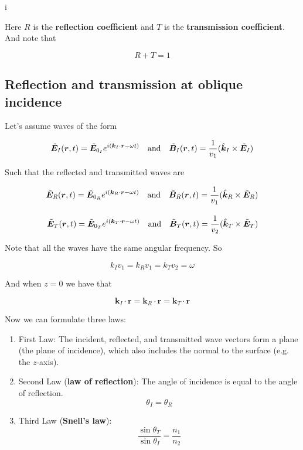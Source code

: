 i\documentclass[a4paper]{article}
\begin{document}
Here $R$ is the \textbf{reflection coefficient} and $T$ is the \textbf{transmission coefficient}. And note that

\begin{equation*}
    R+T=1
\end{equation*}

\subsection{Reflection and transmission at oblique incidence}

Let's assume waves of the form

\begin{align*}
    \Tilde{\bm{E}}_I(\bm{r}, t) = \Tilde{\bm{E}}_{0_{I}}e^{i(\bm{k}_I\cdot\bm{r}-\omega t)}\quad\text{and}\quad\Tilde{\bm{B}}_I(\bm{r}, t) = \frac{1}{v_1}(\hat{\bm{k}}_I\times\Tilde{\bm{E}}_I)
\end{align*}

Such that the reflected and transmitted waves are

\begin{align*}
    \Tilde{\bm{E}}_R(\bm{r}, t) = \Tilde{\bm{E}}_{0_{R}}e^{i(\bm{k}_R\cdot\bm{r}-\omega t)}\quad\text{and}\quad\Tilde{\bm{B}}_R(\bm{r}, t) = \frac{1}{v_1}(\hat{\bm{k}}_R\times\Tilde{\bm{E}}_R)\\[1em]
    \Tilde{\bm{E}}_T(\bm{r}, t) = \Tilde{\bm{E}}_{0_{T}}e^{i(\bm{k}_T\cdot\bm{r}-\omega t)}\quad\text{and}\quad\Tilde{\bm{B}}_T(\bm{r}, t) = \frac{1}{v_2}(\hat{\bm{k}}_T\times\Tilde{\bm{E}}_T)
\end{align*}

Note that all the waves have the same angular frequency. So

\begin{equation*}
    k_Iv_1=k_Rv_1=k_Tv_2=\omega
\end{equation*}

And when $z=0$ we have that

\begin{equation*}
    \bm{k}_I\cdot\bm{r}=\bm{k}_R\cdot\bm{r}=\bm{k}_T\cdot\bm{r}
\end{equation*}

Now we can formulate three laws:

\begin{enumerate}
    \item First Law: The incident, reflected, and transmitted wave vectors form a plane (the plane of incidence), which also includes the normal to the surface (e.g. the $z$-axis).
    \item Second Law (\textbf{law of reflection}): The angle of incidence is equal to the angle of reflection. $$\theta_I=\theta_R$$
    \item Third Law (\textbf{Snell's law}): $$\frac{\sin\theta_T}{\sin\theta_I}=\frac{n_1}{n_2}$$
\end{enumerate}
\end{document}
